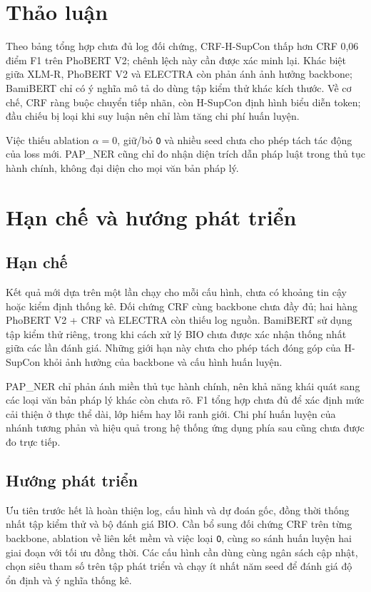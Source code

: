 \documentclass[conference,a4paper]{IEEEtran}
\begin{document}
\section{Thảo luận}\label{sec:discussion}

Theo bảng tổng hợp chưa đủ log đối chứng, CRF-H-SupCon thấp hơn CRF
0,06 điểm F1 trên PhoBERT V2; chênh lệch này cần được xác minh lại.
Khác biệt giữa XLM-R, PhoBERT V2 và ELECTRA còn phản ánh ảnh hưởng backbone;
BamiBERT chỉ có ý nghĩa mô tả do dùng tập kiểm thử khác kích thước. Về cơ
chế, CRF ràng buộc chuyển tiếp nhãn, còn H-SupCon định hình biểu diễn token;
đầu chiếu bị loại khi suy luận nên chỉ làm tăng chi phí huấn luyện.

Việc thiếu ablation $\alpha=0$, giữ/bỏ \texttt{O} và nhiều seed chưa cho
phép tách tác động của loss mới. PAP\_NER cũng chỉ đo nhận diện trích dẫn
pháp luật trong thủ tục hành chính, không đại diện cho mọi văn bản pháp lý.

\section{Hạn chế và hướng phát triển}\label{sec:limitations}

\subsection{Hạn chế}

Kết quả mới dựa trên một lần chạy cho mỗi cấu hình, chưa có khoảng tin
cậy hoặc kiểm định thống kê. Đối chứng CRF cùng backbone chưa đầy đủ;
hai hàng PhoBERT V2 + CRF và ELECTRA còn thiếu log nguồn. BamiBERT sử
dụng tập kiểm thử riêng, trong khi cách xử lý BIO chưa được xác nhận
thống nhất giữa các lần đánh giá. Những giới hạn này chưa cho phép tách
đóng góp của H-SupCon khỏi ảnh hưởng của backbone và cấu hình huấn luyện.

PAP\_NER chỉ phản ánh miền thủ tục hành chính, nên khả năng khái quát
sang các loại văn bản pháp lý khác còn chưa rõ. F1 tổng hợp chưa đủ để
xác định mức cải thiện ở thực thể dài, lớp hiếm hay lỗi ranh giới.
Chi phí huấn luyện của nhánh tương phản và hiệu quả trong hệ thống
ứng dụng phía sau cũng chưa được đo trực tiếp.

\subsection{Hướng phát triển}

Ưu tiên trước hết là hoàn thiện log, cấu hình và dự đoán gốc, đồng thời
thống nhất tập kiểm thử và bộ đánh giá BIO. Cần bổ sung đối chứng CRF
trên từng backbone, ablation về liên kết mềm và việc loại \texttt{O},
cùng so sánh huấn luyện hai giai đoạn với tối ưu đồng thời. Các cấu hình
cần dùng cùng ngân sách cập nhật, chọn siêu tham số trên tập phát triển
và chạy ít nhất năm seed để đánh giá độ ổn định và ý nghĩa thống kê.
\end{document}
